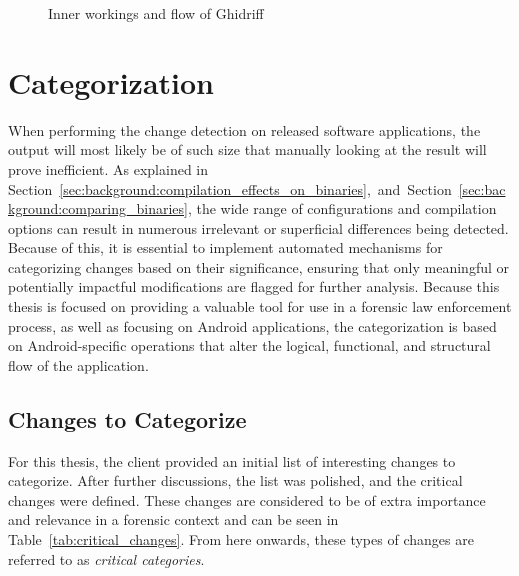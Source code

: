 \begin{figure}
    \caption{Inner workings and flow of Ghidriff}
    \label{fig:ghidriff_diagram}
\end{figure}


\section{Categorization}
\label{sec:method:categorization}

When performing the change detection on released software applications, the output will most likely be of such size that manually looking at the result will prove inefficient. As explained in Section~\ref{sec:background:compilation_effects_on_binaries},~and~Section~\ref{sec:background:comparing_binaries}, the wide range of configurations and compilation options can result in numerous irrelevant or superficial differences being detected. Because of this, it is essential to implement automated mechanisms for categorizing changes based on their significance, ensuring that only meaningful or potentially impactful modifications are flagged for further analysis. Because this thesis is focused on providing a valuable tool for use in a forensic law enforcement process, as well as focusing on Android applications, the categorization is based on Android-specific operations that alter the logical, functional, and structural flow of the application.

\subsection{Changes to Categorize}
\label{sec:method:changes_to_categorize}
For this thesis, the client provided an initial list of interesting changes to categorize. After further discussions, the list was polished, and the critical changes were defined. These changes are considered to be of extra importance and relevance in a forensic context and can be seen in Table~\ref{tab:critical_changes}. From here onwards, these types of changes are referred to as \textit{critical categories}.

